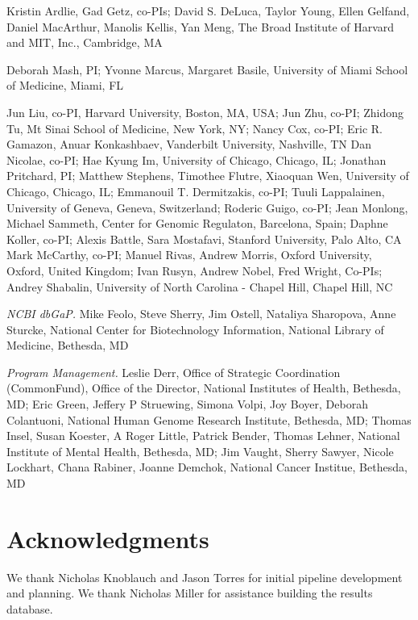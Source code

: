 \documentclass[10pt,letterpaper]{article}
\begin{document}

Kristin Ardlie, Gad Getz, co-PIs; David S. DeLuca, Taylor Young, Ellen Gelfand, Daniel MacArthur, Manolis Kellis, Yan Meng, The Broad Institute of Harvard and MIT, Inc., Cambridge, MA


Deborah Mash, PI; Yvonne Marcus, Margaret Basile, University of Miami School of Medicine, Miami, FL


Jun Liu, co-PI, Harvard University, Boston, MA, USA; Jun Zhu, co-PI; Zhidong Tu, Mt Sinai School of Medicine, New York, NY; Nancy Cox, co-PI; Eric R. Gamazon, Anuar Konkashbaev, Vanderbilt University, Nashville, TN  Dan Nicolae, co-PI; Hae Kyung Im, University of Chicago, Chicago, IL; Jonathan Pritchard, PI; Matthew Stephens, Timothee Flutre, Xiaoquan Wen, University of Chicago, Chicago, IL; Emmanouil T. Dermitzakis, co-PI; Tuuli Lappalainen, University of Geneva, Geneva, Switzerland; Roderic Guigo, co-PI; Jean Monlong, Michael Sammeth, Center for Genomic Regulaton, Barcelona, Spain; Daphne Koller, co-PI; Alexis Battle, Sara Mostafavi, Stanford University, Palo Alto, CA Mark McCarthy, co-PI; Manuel Rivas, Andrew Morris, Oxford University, Oxford, United Kingdom; Ivan Rusyn, Andrew Nobel, Fred Wright, Co-PIs; Andrey Shabalin, University of North Carolina - Chapel Hill, Chapel Hill, NC


\textit{NCBI dbGaP.} Mike Feolo, Steve Sherry, Jim Ostell, Nataliya Sharopova, Anne Sturcke, National Center for Biotechnology Information, National Library of Medicine, Bethesda, MD

\textit{Program Management.} Leslie Derr, Office of Strategic Coordination (CommonFund), Office of the Director, National Institutes of Health, Bethesda, MD; Eric Green, Jeffery P Struewing, Simona Volpi, Joy Boyer, Deborah Colantuoni, National Human Genome Research Institute, Bethesda, MD; Thomas Insel, Susan Koester, A Roger Little, Patrick Bender, Thomas Lehner, National Institute of Mental Health, Bethesda, MD; Jim Vaught, Sherry Sawyer, Nicole Lockhart, Chana Rabiner, Joanne Demchok, National Cancer Institue, Bethesda, MD

\section*{Acknowledgments}
We thank Nicholas Knoblauch and Jason Torres for initial pipeline
development and planning. We thank Nicholas Miller for assistance building
the results database.
\end{document}
